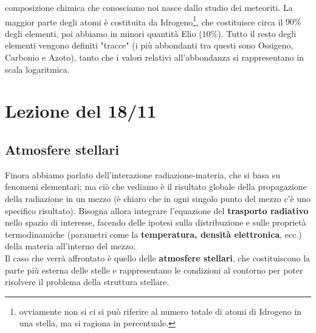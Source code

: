 \documentclass[a4paper,11pt]{article}
\begin{document}
composizione chimica che conosciamo noi nasce dallo studio dei meteoriti. La maggior parte degli atomi è costituita da Idrogeno\footnote{ovviamente non si ci si può riferire al numero totale di atomi di Idrogeno in una stella, ma si ragiona in percentuale.}, che costituisce circa il \(90 \%\) degli elementi, poi abbiamo in minori quantità Elio (\(10 \%\)). Tutto il resto degli elementi vengono definiti "tracce" (i più abbondanti tra questi sono Ossigeno, Carbonio e Azoto), tanto che i valori relativi all'abbondanza si rappresentano in scala logaritmica.
   
\newpage

\section{Lezione del 18/11}
\subsection{Atmosfere stellari}
Finora abbiamo parlato dell'interazione radiazione-materia, che si basa su fenomeni elementari; ma ciò che vediamo è il risultato globale della propagazione della radiazione in un mezzo (è chiaro che in ogni singolo punto del mezzo c'è uno specifico risultato). Bisogna allora integrare l'equazione del \textbf{trasporto radiativo} nello spazio di interesse, facendo delle ipotesi sulla distribuzione e sulle proprietà termodinamiche (parametri come la \textbf{temperatura, densità elettronica}, ecc.) della materia all'interno del mezzo. \\ Il caso che verrà affrontato è quello delle \textbf{atmosfere stellari}, che costituiscono la parte più esterna delle stelle e rappresentano le condizioni al contorno per poter risolvere il problema della struttura stellare.
\end{document}

